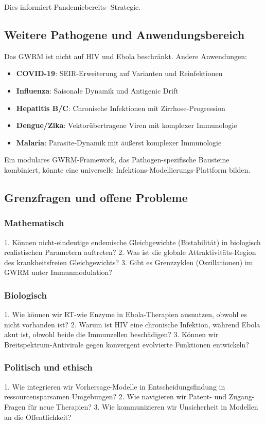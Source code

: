 ﻿\documentclass[a4paper,12pt]{article}
\theoremstyle{definition}
\begin{document}
Dies informiert Pandemiebereits- Strategie.

\subsection{Weitere Pathogene und Anwendungsbereich}

Das GWRM ist nicht auf HIV und Ebola beschränkt. Andere Anwendungen:
\begin{itemize}
\item \textbf{COVID-19}: SEIR-Erweiterung auf Varianten und Reinfektionen
\item \textbf{Influenza}: Saisonale Dynamik und Antigenic Drift
\item \textbf{Hepatitis B/C}: Chronische Infektionen mit Zirrhose-Progression
\item \textbf{Dengue/Zika}: Vektorübertragene Viren mit komplexer Immunologie
\item \textbf{Malaria}: Parasite-Dynamik mit äußerst komplexer Immunologie
\end{itemize}

Ein modulares GWRM-Framework, das Pathogen-spezifische Bausteine kombiniert, könnte eine universelle Infektions-Modellierungs-Plattform bilden.

\subsection{Grenzfragen und offene Probleme}

\subsubsection{Mathematisch}
1. Können nicht-eindeutige endemische Gleichgewichte (Bistabilität) in biologisch realistischen Parametern auftreten?
2. Was ist die globale Attraktivitäts-Region des krankheitsfreien Gleichgewichts?
3. Gibt es Grenzzyklen (Oszillationen) im GWRM unter Immunmodulation?

\subsubsection{Biologisch}
1. Wie können wir RT-wie Enzyme in Ebola-Therapien ausnutzen, obwohl es nicht vorhanden ist?
2. Warum ist HIV eine chronische Infektion, während Ebola akut ist, obwohl beide die Immunzellen beschädigen?
3. Können wir Breitspektrum-Antivirale gegen konvergent evolvierte Funktionen entwickeln?

\subsubsection{Politisch und ethisch}
1. Wie integrieren wir Vorhersage-Modelle in Entscheidungsfindung in ressourcensparsamen Umgebungen?
2. Wie navigieren wir Patent- und Zugang-Fragen für neue Therapien?
3. Wie kommunizieren wir Unsicherheit in Modellen an die Öffentlichkeit?
\end{document}

